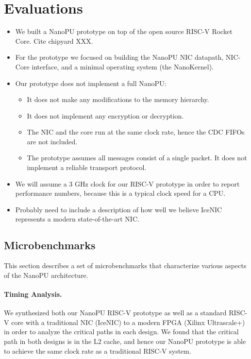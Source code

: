 \section{Evaluations}
\begin{itemize}
    \item We built a NanoPU prototype on top of the open source RISC-V Rocket Core. Cite chipyard XXX.
    \item For the prototype we focused on building the NanoPU NIC datapath, NIC-Core interface, and a minimal operating system (the NanoKernel).
    \item Our prototype does not implement a full NanoPU:
    \begin{itemize}
        \item It does not make any modifications to the memory hierarchy.
        \item It does not implement any encryption or decryption.
        \item The NIC and the core run at the same clock rate, hence the CDC FIFOs are not included.
        \item The prototype assumes all messages consist of a single packet. It does not implement a reliable transport protocol.
    \end{itemize}
    \item We will assume a 3 GHz clock for our RISC-V prototype in order to report performance numbers, because this is a typical clock speed for a CPU. 
    \item Probably need to include a description of how well we believe IceNIC represents a modern state-of-the-art NIC.
\end{itemize}

\subsection{Microbenchmarks}
This section describes a set of microbenchmarks that characterize various aspects of the NanoPU architecture.

\paragraph{Timing Analysis.} We synthesized both our NanoPU RISC-V prototype as well as a standard RISC-V core with a traditional NIC (IceNIC) to a modern FPGA (Xilinx Ultrascale+) in order to analyze the critical paths in each design.
We found that the critical path in both designs is in the L2 cache, and hence our NanoPU prototype is able to achieve the same clock rate as a traditional RISC-V system.

